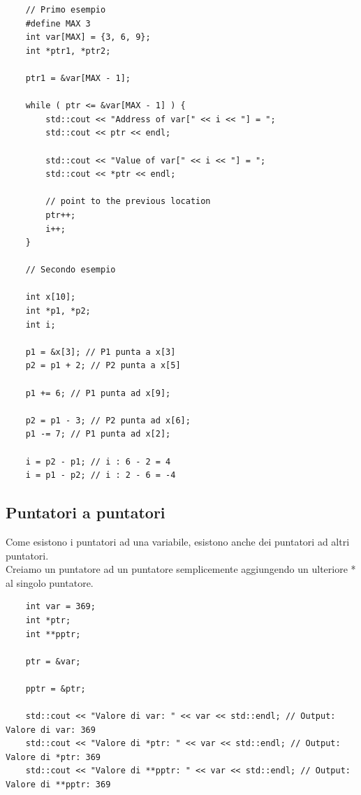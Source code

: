 \begin{lstlisting}
	// Primo esempio
	#define MAX 3
	int var[MAX] = {3, 6, 9};
	int *ptr1, *ptr2;
	
	ptr1 = &var[MAX - 1];
	
	while ( ptr <= &var[MAX - 1] ) {
		std::cout << "Address of var[" << i << "] = ";
		std::cout << ptr << endl;
		
		std::cout << "Value of var[" << i << "] = ";
		std::cout << *ptr << endl;
		
		// point to the previous location
		ptr++;
		i++;
	}
	
	// Secondo esempio
	
	int x[10];
	int *p1, *p2;
	int i;
	
	p1 = &x[3]; // P1 punta a x[3]
	p2 = p1 + 2; // P2 punta a x[5]
	
	p1 += 6; // P1 punta ad x[9];
	
	p2 = p1 - 3; // P2 punta ad x[6];
	p1 -= 7; // P1 punta ad x[2];
	
	i = p2 - p1; // i : 6 - 2 = 4
	i = p1 - p2; // i : 2 - 6 = -4
\end{lstlisting}

\subsection{Puntatori a puntatori}

\textsf{\small Come esistono i puntatori ad una variabile, esistono anche dei puntatori ad altri puntatori.} \\

\textsf{\small Creiamo un puntatore ad un puntatore semplicemente aggiungendo un ulteriore * al singolo puntatore.}

\begin{lstlisting}
	int var = 369;
	int *ptr;
	int **pptr;
	
	ptr = &var;
	
	pptr = &ptr;
	
	std::cout << "Valore di var: " << var << std::endl; // Output: Valore di var: 369
	std::cout << "Valore di *ptr: " << var << std::endl; // Output: Valore di *ptr: 369
	std::cout << "Valore di **pptr: " << var << std::endl; // Output: Valore di **pptr: 369
\end{lstlisting}



